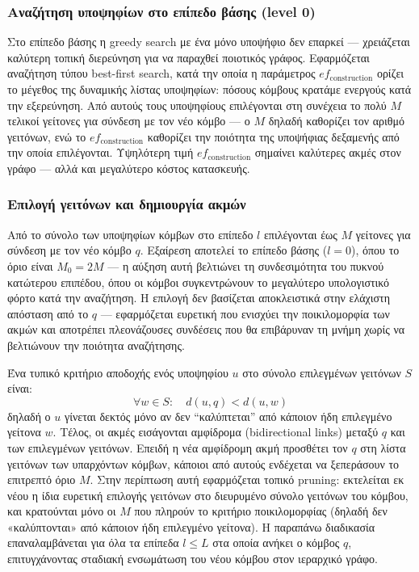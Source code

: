 \documentclass[12pt,a4paper]{article}
\begin{document}
\subsubsection{Αναζήτηση υποψηφίων στο επίπεδο βάσης (level 0)}
Στο επίπεδο βάσης η greedy search με ένα μόνο υποψήφιο δεν επαρκεί --- χρειάζεται καλύτερη τοπική διερεύνηση για να παραχθεί ποιοτικός γράφος. Εφαρμόζεται αναζήτηση τύπου best-first search, κατά την οποία η παράμετρος $ef_{\text{construction}}$ ορίζει το μέγεθος της δυναμικής λίστας υποψηφίων: πόσους κόμβους κρατάμε ενεργούς κατά την εξερεύνηση. Από αυτούς τους υποψηφίους επιλέγονται στη συνέχεια το πολύ $M$ τελικοί γείτονες για σύνδεση με τον νέο κόμβο --- ο $M$ δηλαδή καθορίζει τον αριθμό γειτόνων, ενώ το $ef_{\text{construction}}$ καθορίζει την ποιότητα της υποψήφιας δεξαμενής από την οποία επιλέγονται. Υψηλότερη τιμή $ef_{\text{construction}}$ σημαίνει καλύτερες ακμές στον γράφο --- αλλά και μεγαλύτερο κόστος κατασκευής.


\subsubsection{Επιλογή γειτόνων και δημιουργία ακμών}
Από το σύνολο των υποψηφίων κόμβων στο επίπεδο $l$ επιλέγονται έως $M$ γείτονες για σύνδεση με τον νέο κόμβο $q$. Εξαίρεση αποτελεί το επίπεδο βάσης ($l = 0$), όπου το όριο είναι $M_0 = 2M$ --- η αύξηση αυτή βελτιώνει τη συνδεσιμότητα του πυκνού κατώτερου επιπέδου, όπου οι κόμβοι συγκεντρώνουν το μεγαλύτερο υπολογιστικό φόρτο κατά την αναζήτηση. Η επιλογή δεν βασίζεται αποκλειστικά στην ελάχιστη απόσταση από το $q$ --- εφαρμόζεται ευρετική που ενισχύει την ποικιλομορφία των ακμών και αποτρέπει πλεονάζουσες συνδέσεις που θα επιβάρυναν τη μνήμη χωρίς να βελτιώνουν την ποιότητα αναζήτησης.

Ένα τυπικό κριτήριο αποδοχής ενός υποψηφίου $u$ στο σύνολο επιλεγμένων γειτόνων $S$ είναι:
\begin{equation}
    \forall w \in S:\quad d(u,q) < d(u,w)
\end{equation}
δηλαδή ο $u$ γίνεται δεκτός μόνο αν δεν ``καλύπτεται'' από κάποιον ήδη επιλεγμένο γείτονα $w$.
Τέλος, οι ακμές εισάγονται αμφίδρομα (bidirectional links) μεταξύ $q$ και των επιλεγμένων γειτόνων. Επειδή η νέα αμφίδρομη ακμή προσθέτει τον $q$ στη λίστα γειτόνων των υπαρχόντων κόμβων, κάποιοι από αυτούς ενδέχεται να ξεπεράσουν το επιτρεπτό όριο $M$. Στην περίπτωση αυτή εφαρμόζεται τοπικό pruning: εκτελείται εκ νέου η ίδια ευρετική επιλογής γειτόνων στο διευρυμένο σύνολο γειτόνων του κόμβου, και κρατούνται μόνο οι $M$ που πληρούν το κριτήριο ποικιλομορφίας (δηλαδή δεν «καλύπτονται» από κάποιον ήδη επιλεγμένο γείτονα).
\medskip
Η παραπάνω διαδικασία επαναλαμβάνεται για όλα τα επίπεδα  $l \le L$ στα οποία ανήκει ο κόμβος $q$, επιτυγχάνοντας σταδιακή ενσωμάτωση του νέου κόμβου στον ιεραρχικό γράφο.
\end{document}
